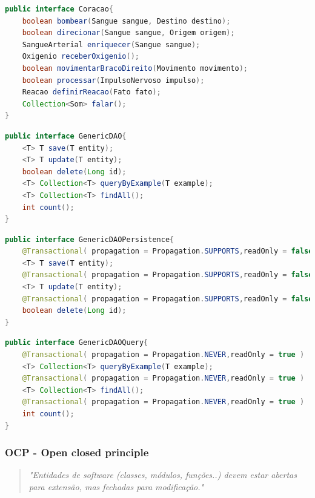 \documentclass[12pt]{article}
\begin{document}

\begin{lstlisting}[caption=Exemplo de violação ao SRP,language=java]
public interface Coracao{
	boolean bombear(Sangue sangue, Destino destino);
	boolean direcionar(Sangue sangue, Origem origem);
	SangueArterial enriquecer(Sangue sangue);
	Oxigenio receberOxigenio();
	boolean movimentarBracoDireito(Movimento movimento);
	boolean processar(ImpulsoNervoso impulso);
	Reacao definirReacao(Fato fato);
	Collection<Som> falar();
}
\end{lstlisting}

\begin{lstlisting}[caption=Exemplo 2.1 de conformidade ao SRP,language=java]
public interface GenericDAO{
	<T> T save(T entity);
	<T> T update(T entity);
	boolean delete(Long id);
	<T> Collection<T> queryByExample(T example);
	<T> Collection<T> findAll();
	int count();
}
\end{lstlisting}

\begin{lstlisting}[caption=Exemplo 2.2.1 de conformidade ao SRP,language=java]
public interface GenericDAOPersistence{
	@Transactional( propagation = Propagation.SUPPORTS,readOnly = false )
	<T> T save(T entity);
	@Transactional( propagation = Propagation.SUPPORTS,readOnly = false )
	<T> T update(T entity);
	@Transactional( propagation = Propagation.SUPPORTS,readOnly = false )
	boolean delete(Long id);
}
\end{lstlisting}
\begin{lstlisting}[caption=Exemplo 2.2.2 de conformidade ao SRP,language=java]
public interface GenericDAOQuery{
	@Transactional( propagation = Propagation.NEVER,readOnly = true )
	<T> Collection<T> queryByExample(T example);
	@Transactional( propagation = Propagation.NEVER,readOnly = true )
	<T> Collection<T> findAll();
	@Transactional( propagation = Propagation.NEVER,readOnly = true )
	int count();
}
\end{lstlisting}

\subsubsection{OCP - Open closed principle}

\begin{quote}
	\textit{"Entidades de software (classes, módulos, funções..) devem estar abertas para extensão, mas fechadas para modificação."}	
\end{quote}
\end{document}
